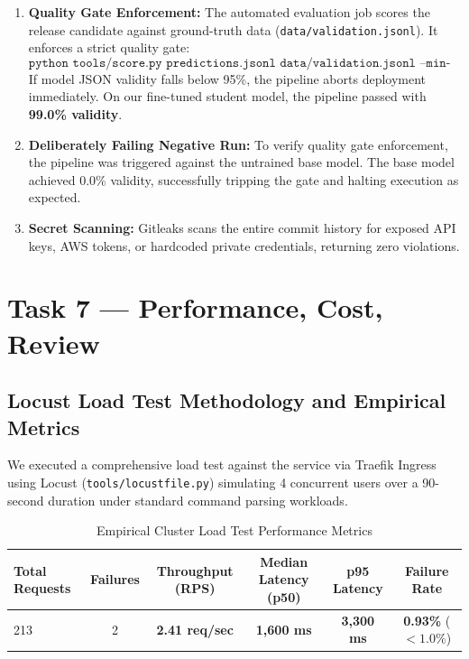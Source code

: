 \documentclass[10pt,a4paper]{article}
\begin{document}
\begin{enumerate}[noitemsep,topsep=2pt,leftmargin=*]
    \item \textbf{Quality Gate Enforcement:} The automated evaluation job scores the release candidate against ground-truth data (\texttt{data/validation.jsonl}). It enforces a strict quality gate:
    $$\texttt{python tools/score.py predictions.jsonl data/validation.jsonl --min-validity 95}$$
    If model JSON validity falls below 95\%, the pipeline aborts deployment immediately. On our fine-tuned student model, the pipeline passed with \textbf{99.0\% validity}.
    \item \textbf{Deliberately Failing Negative Run:} To verify quality gate enforcement, the pipeline was triggered against the untrained base model. The base model achieved 0.0\% validity, successfully tripping the gate and halting execution as expected.
    \item \textbf{Secret Scanning:} Gitleaks scans the entire commit history for exposed API keys, AWS tokens, or hardcoded private credentials, returning zero violations.
\end{enumerate}

\vspace{0.25cm}

\section{Task 7 --- Performance, Cost, Review}

\subsection{Locust Load Test Methodology and Empirical Metrics}
We executed a comprehensive load test against the service via Traefik Ingress using Locust (\texttt{tools/locustfile.py}) simulating 4 concurrent users over a 90-second duration under standard command parsing workloads.

\begin{table}[h!]
\centering
\small
\caption{Empirical Cluster Load Test Performance Metrics}
\vspace{0.1cm}
\begin{tabular*}{\textwidth}{@{\extracolsep{\fill}}lccccc@{}}
\toprule
\textbf{Total Requests} & \textbf{Failures} & \textbf{Throughput (RPS)} & \textbf{Median Latency (p50)} & \textbf{p95 Latency} & \textbf{Failure Rate} \\
\midrule
213 & 2 & \textbf{2.41 req/sec} & \textbf{1,600 ms} & \textbf{3,300 ms} & \textbf{0.93\%} ($< 1.0\%$) \\
\bottomrule
\end{tabular*}
\end{table}
\end{document}
